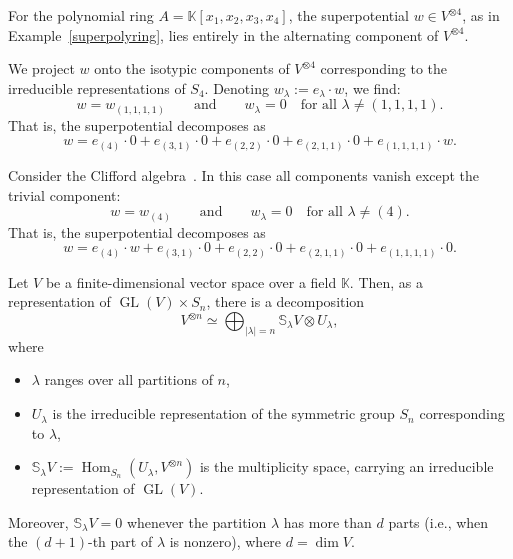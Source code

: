 \documentclass{amsart}
\DeclareMathOperator{\Hom}{Hom}
\DeclareMathOperator{\GL}{GL}
\begin{document}
\begin{example}
For the polynomial ring \( A = \mathbb{K}[x_1,x_2,x_3,x_4] \), the superpotential \( w \in V^{\otimes 4} \), as in Example~\ref{superpolyring}, lies entirely in the alternating component of \( V^{\otimes 4} \).

We project \( w \) onto the isotypic components of \( V^{\otimes 4} \) corresponding to the irreducible representations of \( S_4 \). Denoting \( w_\lambda := e_\lambda \cdot w \), we find:
\[
w = w_{(1,1,1,1)} \qquad \text{and} \qquad w_\lambda = 0 \quad \text{for all } \lambda \ne (1,1,1,1).
\]
That is, the superpotential decomposes as
\[
w = e_{(4)} \cdot 0 + e_{(3,1)} \cdot 0 + e_{(2,2)} \cdot 0 + e_{(2,1,1)} \cdot 0 + e_{(1,1,1,1)} \cdot w.
\]
\end{example}

\begin{example}
Consider the Clifford algebra~\cite[Section 1.1]{Cassidy2010GeneralizationsOG}. In this case all components vanish except the trivial component:
\[
w = w_{(4)} \qquad \text{and} \qquad w_\lambda = 0 \quad \text{for all } \lambda \ne (4).
\]
That is, the superpotential decomposes as
\[
w = e_{(4)} \cdot w + e_{(3,1)} \cdot 0 + e_{(2,2)} \cdot 0 + e_{(2,1,1)} \cdot 0 + e_{(1,1,1,1)} \cdot 0.
\]
\end{example}


\begin{theorem}
\label{schurweylduality}
Let \( V \) be a finite-dimensional vector space over a field \( \mathbb{K} \). Then, as a representation of \( \GL(V) \times S_n \), there is a decomposition
\[
V^{\otimes n} \simeq \bigoplus_{|\lambda| = n} \mathbb{S}_\lambda V \otimes U_\lambda,
\]
where
\begin{itemize}
    \item \( \lambda \) ranges over all partitions of \( n \),
    \item \( U_\lambda \) is the irreducible representation of the symmetric group \( S_n \) corresponding to \( \lambda \),
    \item \( \mathbb{S}_\lambda V := \Hom_{S_n}(U_\lambda, V^{\otimes n}) \) is the multiplicity space, carrying an irreducible representation of \( \GL(V) \).
\end{itemize}  
\end{theorem}

Moreover, \( \mathbb{S}_\lambda V = 0 \) whenever the partition \( \lambda \) has more than \( d \) parts (i.e., when the \((d+1)\)-th part of \( \lambda \) is nonzero), where $d = \dim V.$
\end{document}
